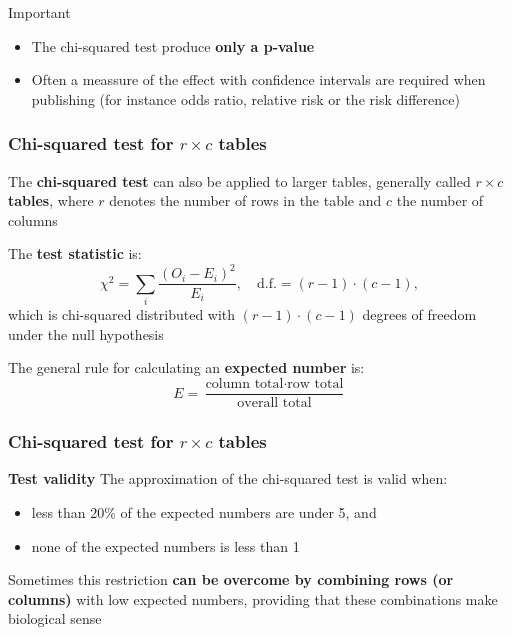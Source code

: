 \documentclass[compress, notes=hide]{beamer}
\newcommand{\hl}[1]{\textbf{#1}}
\begin{document}
\begin{frame}
	\begin{block}{Important}
		\begin{itemize}
			\item The chi-squared test produce \hl{only a p-value}
			\item Often a meassure of the effect with confidence intervals are
			required when publishing (for instance odds ratio, relative risk or
			the risk difference)
		\end{itemize}
	\end{block}
\end{frame}


\begin{frame}
	\frametitle{Chi-squared test for $r \times c$ tables}
	\begin{block}{}
		The \hl{chi-squared test} can also be applied to larger
		tables, generally called \hl{$r \times c$ tables}, where $r$
		denotes the number of rows in the table and $c$ the number of
		columns
		
		\vspace{0.2cm}
		The \hl{test statistic} is:
		\begin{equation}
			\chi^2 = \sum_i \frac{(O_i - E_i)^2}{E_i}, \quad \mathrm{d.f.} = (r - 1) \cdot (c - 1),
		\end{equation}
		which is chi-squared distributed with $(r - 1) \cdot (c - 1)$ degrees
		of freedom under the null hypothesis
		
		\vspace{0.2cm}
		The general rule for calculating an \hl{expected number} is:
		\begin{equation}
			E = \frac{\text{column total} \cdot \text{row total}}{\text{overall total}}
		\end{equation}

	\end{block}
\end{frame}



\begin{frame}
	\frametitle{Chi-squared test for $r \times c$ tables}
	\textbf{Test validity}
	The approximation of the chi-squared test is valid when:
	\begin{itemize}
		\item{less than 20\% of the expected numbers are under 5, and}
		\item{none of the expected numbers is less than 1}
	\end{itemize}
	Sometimes this restriction \hl{can be overcome by combining rows
		(or columns)} with low expected numbers, providing that these
	combinations make biological sense

\end{frame}
\end{document}
